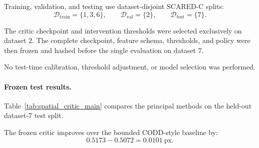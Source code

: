 \documentclass[11pt,a4paper]{article}
\begin{document}
Training, validation, and testing use dataset-disjoint SCARED-C splits:
\begin{equation}
    \mathcal{D}_{\mathrm{train}}=\{1,3,6\},
    \qquad
    \mathcal{D}_{\mathrm{val}}=\{2\},
    \qquad
    \mathcal{D}_{\mathrm{test}}=\{7\}.
\end{equation}

The critic checkpoint and intervention thresholds were selected exclusively on
dataset \(2\). The complete checkpoint, feature schema, thresholds, and policy
were then frozen and hashed before the single evaluation on dataset \(7\).

No test-time calibration, threshold adjustment, or model selection was
performed.

\paragraph{Frozen test results.}

Table~\ref{tab:spatial_critic_main} compares the principal methods on the
held-out dataset-7 test split.

\begin{table}[t]
    \centering
    \caption{Frozen dataset-7 evaluation of the spatial safety critic.
    Lower EPE is better.}
    \label{tab:spatial_critic_main}
\end{table}

The frozen critic improves over the bounded CODD-style baseline by:
\begin{equation}
    0.5173-0.5072
    =
    0.0101\ \mathrm{px}.
\end{equation}
\end{document}
